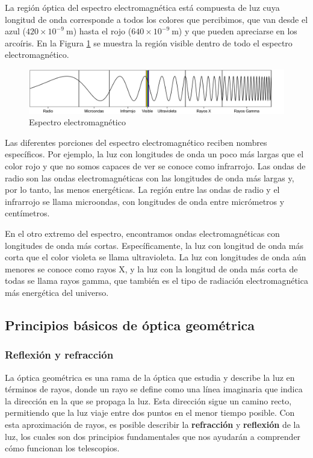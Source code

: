 La región óptica del espectro electromagnética está compuesta de luz cuya longitud de onda corresponde a todos los colores que percibimos, que van desde el azul ($ 420 \times 10^{-9} ~\mathrm{m} $) hasta el rojo ($ 640\times 10^{-9} ~\mathrm{m} $) y que pueden apreciarse en los arcoíris. En la Figura \ref{fig:em_spectrum} se muestra la región visible dentro de todo el espectro electromagnético.

\begin{figure}[htb]
  \centering
  \includegraphics[width=\textwidth]{figures/em_spectrum.png}
  \caption{Espectro electromagnético}
  \label{fig:em_spectrum}
\end{figure}

Las diferentes porciones del espectro electromagnético reciben nombres específicos. Por ejemplo, la luz con longitudes de onda un poco más largas que el color rojo y que no somos capaces de ver se conoce como infrarrojo. Las ondas de radio son las ondas electromagnéticas con las longitudes de onda más largas y, por lo tanto, las menos energéticas. La región entre las ondas de radio y el infrarrojo se llama microondas, con longitudes de onda entre micrómetros y centímetros.

En el otro extremo del espectro, encontramos ondas electromagnéticas con longitudes de onda más cortas. Específicamente, la luz con longitud de onda más corta que el color violeta se llama ultravioleta. La luz con longitudes de onda aún menores se conoce como rayos X, y la luz con la longitud de onda más corta de todas se llama rayos gamma, que también es el tipo de radiación electromagnética más energética del universo.

\subsection{Principios básicos de óptica geométrica}
\subsubsection{Reflexión y refracción}
La óptica geométrica es una rama de la óptica que estudia y describe la luz en términos de rayos, donde un rayo se define como una línea imaginaria que indica la dirección en la que se propaga la luz. Esta dirección sigue un camino recto, permitiendo que la luz viaje entre dos puntos en el menor tiempo posible. Con esta aproximación de rayos, es posible describir la \textbf{refracción} y \textbf{reflexión} de la luz, los cuales son dos principios fundamentales que nos ayudarán a comprender cómo funcionan los telescopios. 

